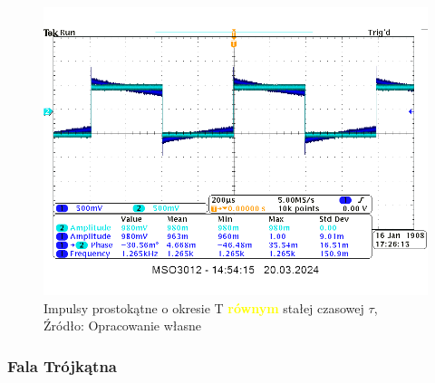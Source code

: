 \documentclass{article}
\begin{document}
        \begin{figure}[!ht]
          \centering
          \includegraphics[scale=0.2]{grafiki/P_T.png}
          \caption{Impulsy prostokątne o okresie T \textbf{\textcolor{yellow}{równym}} stałej czasowej $\tau$,
              \\Źródło: Opracowanie własne}
        \end{figure}

      \subsubsection{Fala Trójkątna}
\end{document}
